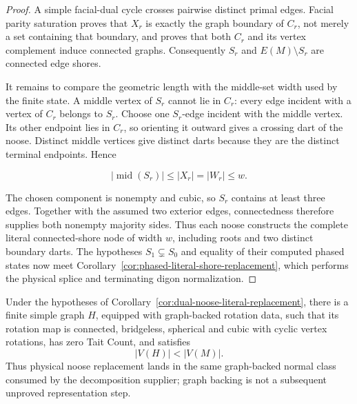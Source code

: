 \begin{proof}
A simple facial-dual cycle crosses pairwise distinct primal edges.  Facial
parity saturation proves that \(X_r\) is exactly the graph boundary of
\(C_r\), not merely a set containing that boundary, and proves that both
\(C_r\) and its vertex complement induce connected graphs.  Consequently
\(S_r\) and \(E(M)\setminus S_r\) are connected edge shores.

It remains to compare the geometric length with the middle-set width used by
the finite state.  A middle vertex of \(S_r\) cannot lie in \(C_r\): every
edge incident with a vertex of \(C_r\) belongs to \(S_r\).  Choose one
\(S_r\)-edge incident with the middle vertex.  Its other endpoint lies in
\(C_r\), so orienting it outward gives a crossing dart of the noose.  Distinct
middle vertices give distinct darts because they are the distinct terminal
endpoints.  Hence

\[
 |\operatorname{mid}(S_r)|\le |X_r|=|W_r|\le w.
\]

The chosen component is nonempty and cubic, so \(S_r\) contains at least
three edges.  Together with the assumed two exterior edges, connectedness
therefore supplies both nonempty majority sides.  Thus each noose constructs
the complete literal connected-shore node of width \(w\), including roots
and two distinct boundary darts.  The hypotheses \(S_1\subsetneq S_0\) and
equality of their computed phased states now meet
Corollary~\ref{cor:phased-literal-shore-replacement}, which performs the
physical splice and terminating digon normalization.
\end{proof}

\begin{corollary}
\label{cor:dual-noose-graph-backed-replacement}
Under the hypotheses of
Corollary~\ref{cor:dual-noose-literal-replacement}, there is a finite simple
graph \(H\), equipped with graph-backed rotation data, such that its rotation
map is connected, bridgeless, spherical and cubic with cyclic vertex
rotations, has zero Tait Count, and satisfies
\[
                         |V(H)|<|V(M)|.
\]
Thus physical noose replacement lands in the same graph-backed normal class
consumed by the decomposition supplier; graph backing is not a subsequent
unproved representation step.
\end{corollary}

